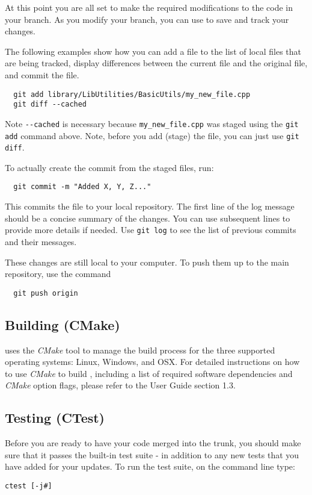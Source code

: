 \begin{itemize}
  At this point you are all set to make the required modifications to the 
  code in your branch.  As you modify your branch, you can use {\GIT} to
  save and track your changes.

  The following examples show how you can add a file to the list of local
  files that are being tracked, display differences between the current
  file and the original file, and commit the file.  
  \begin{lstlisting}
  git add library/LibUtilities/BasicUtils/my_new_file.cpp
  git diff --cached
  \end{lstlisting}

  Note \lstinline{--cached} is necessary because \lstinline{my_new_file.cpp} was staged using
  the \lstinline{git add} command above.  Note, before you add (stage) the
  file, you can just use \lstinline{git diff}.
  
  To actually create the commit from the staged files, run:
  \begin{lstlisting}
  git commit -m "Added X, Y, Z..."
  \end{lstlisting}
  This commits the file to your local repository. The first line of the log message should be a concise summary of the changes. You can use subsequent lines to provide more details if needed. Use \lstinline{git log} to see the list of previous commits and their messages.
  
  These changes are still local to your computer. To push them up to the main {\nek} repository, use the command
  \begin{lstlisting}
  git push origin
  \end{lstlisting}
\end{itemize}

\subsection{Building (CMake)}

{\nek} uses the \emph{CMake} tool to manage the build process for
the three supported operating systems: Linux, Windows, and OSX.  For
detailed instructions on how to use \emph{CMake} to build {\nek},
including a list of required software dependencies and \emph{CMake}
option flags, please refer to the {\nek} User Guide section 1.3.

\subsection{Testing (CTest)}
Before you are ready to have your code merged into the {\nek}
trunk, you should make sure that it passes the built-in test suite -
in addition to any new tests that you have added for your
updates. To run the test suite, on the command line type:
\begin{lstlisting}  
ctest [-j#]
\end{lstlisting}
  
